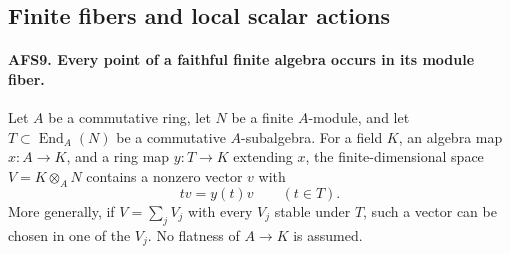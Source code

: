 \documentclass[11pt,a4paper]{article}
\numberwithin{equation}{section}
\theoremstyle{remark}\newtheorem{remark}[theorem]{Remark}
\begin{document}
\subsection{Finite fibers and local scalar actions}

\paragraph{AFS9. Every point of a faithful finite algebra occurs in its module fiber.}
\label{claim:AFS9}
Let $A$ be a commutative ring, let $N$ be a finite $A$-module,
and let $T\subset\operatorname{End}_A(N)$ be a commutative
$A$-subalgebra.  For a field $K$, an algebra map $x:A\to K$,
and a ring map $y:T\to K$ extending $x$, the finite-dimensional
space $V=K\otimes_A N$ contains a nonzero vector $v$ with
\[
             t v=y(t)v\qquad(t\in T).
\]
More generally, if $V=\sum_jV_j$ with every $V_j$ stable
under $T$, such a vector can be chosen in one of the $V_j$.
No flatness of $A\to K$ is assumed.
\end{document}
